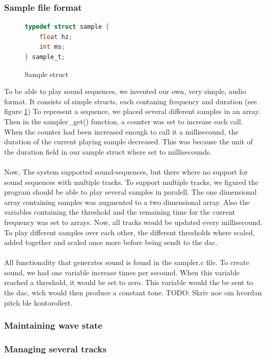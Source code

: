 \subsubsection{Sample file format}
\begin{figure}[h]
	\centering
	\begin{lstlisting}[language=C]
typedef struct sample {
	float hz;
	int ms;
} sample_t;
	\end{lstlisting}
	\caption{Sample struct}
	\label{file_format_struct}
\end{figure}
To be able to play sound sequences, we invented our own, very simple, audio format. It consists of simple structs, each contaning frequency and duration (see figure \ref{file_format_struct}) To represent a sequence, we placed several different samples in an array. Then in the sampler\_get() function, a counter was set to increase each call. When the counter had been increased enough to call it a millisecound, the duration of the current playing sample decreased. This was because the  unit of the duration field in our sample struct where set to millisecounds.\\
\\
Now, The system supported sound-sequences, but there where no support for sound sequences with multiple tracks. To support multiple tracks, we figured the program should be able to play several samples in paralell. The one dimensional array containing samples was augmented to a two dimensional array. Also the variables containing the threshold and the remaining time for the current frequency was set to arrays. Now, all tracks would be updated every millisecound. To play different samples over each other, the different thresholds where scaled, added together and scaled once more before being sendt to the dac.\\
\\
All functionality that generates sound is found in the sampler.c file. To create sound, we had one variable increase \samplerPullsPerSecound times per secound. When this variable reached a threshold, it would be set to zero. This variable would the be sent to the dac, wich would  then produce a constant tone. TODO: Skriv noe om hvordan pitch ble kontorollert. \\

\subsubsection{Maintaining wave state}

\subsubsection{Managing several tracks}

